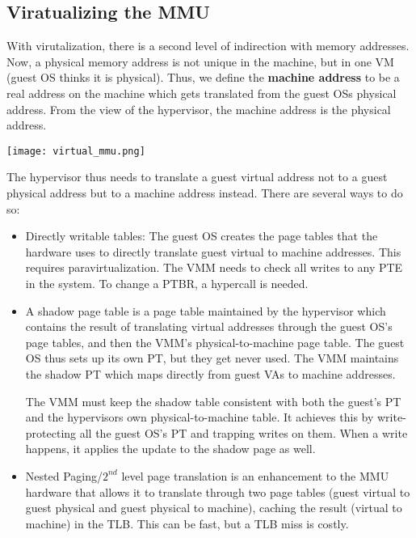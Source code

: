 \subsection{Viratualizing the MMU}

With virutalization, there is a second level of indirection with memory addresses. Now, a physical memory address is not unique in the machine, but in one VM (guest OS thinks it is physical). Thus, we define the \textbf{machine address} to be a real address on the machine which gets translated from the guest OSs physical address. From the view of the hypervisor, the machine address is the physical address.

\begin{center}
	\texttt{[image: virtual\_mmu.png]}
\end{center}

The hypervisor thus needs to translate a guest virtual address not to a guest physical address but to a machine address instead. There are several ways to do so:
\begin{itemize}
	\item Directly writable tables: The guest OS creates the page tables that the hardware uses to directly translate guest virtual to machine addresses. This requires paravirtualization. The VMM needs to check all writes to any PTE in the system. To change a PTBR, a hypercall is needed.
	\item A shadow page table is a page table maintained by the hypervisor which contains the result of translating virtual addresses through the guest OS’s page tables, and then the VMM’s physical-to-machine page table. The guest OS thus sets up its own PT, but they get never used. The VMM maintains the shadow PT which maps directly from guest VAs to machine addresses. \medskip
		
		The VMM must keep the shadow table consistent with both the guest’s PT and the hypervisors own physical-to-machine table. It achieves this by write-protecting all the guest OS's PT and trapping writes on them. When a write happens, it applies the update to the shadow page as well.
	\item Nested Paging/$2^{nd}$ level page translation is an enhancement to the MMU hardware that allows it to translate through two page tables (guest virtual to guest physical and guest physical to machine), caching the result (virtual to machine) in the TLB. This can be fast, but a TLB miss is costly.
\end{itemize}


